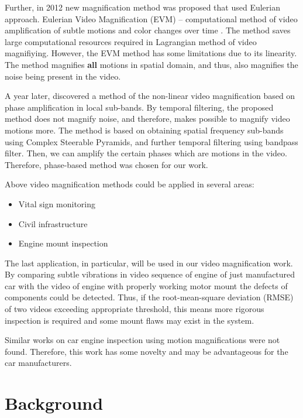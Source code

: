 \documentclass{IEEEtran}
\begin{document}
Further, in 2012 new magnification method was proposed that used Eulerian approach. Eulerian Video Magnification (EVM) – computational method of video amplification of subtle motions and color changes over time \cite{Wu:2012:EVM:2185520.2185561}. The method saves large computational resources required in Lagrangian method of video magnifiying. However, the EVM method has some limitations due to its linearity. The method magnifies \textbf{all} motions in spatial domain, and thus, also magnifies the noise being present in the video.

A year later, \cite{Wadhwa:2013:PVM:2461912.2461966} discovered a method of the non-linear video magnification based on phase amplification in local sub-bands. By temporal filtering, the proposed method does not magnify noise, and therefore, makes possible to magnify video motions more. The method is based on obtaining spatial frequency sub-bands using Complex Steerable Pyramids, and further temporal filtering using bandpass filter. Then, we can amplify the certain phases which are motions in the video. Therefore, phase-based method was chosen for our work.

Above video magnification methods could be applied in several areas:

\begin{itemize}
	\item{Vital sign monitoring \cite{Aubakir2016VitalSM}}
	\item{Civil infrastructure}
	\item{Engine mount inspection}
\end{itemize}

The last application, in particular, will be used in our video magnification work. By comparing subtle vibrations in video sequence of engine of just manufactured car with the video of engine with properly working motor mount the defects of components could be detected. Thus, if the root-mean-square deviation (RMSE) of two videos exceeding appropriate threshold, this means more rigorous inspection is required and some mount flaws may exist in the system.

Similar works on car engine inspection using motion magnifications were not found. Therefore, this work has some novelty and may be advantageous for the car manufacturers.

\section{Background}
\end{document}

